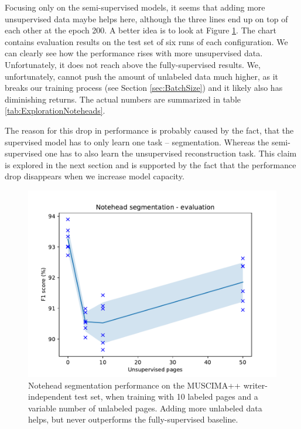 Focusing only on the semi-supervised models, it seems that adding more unsupervised data maybe helps here, although the three lines end up on top of each other at the epoch 200. A better idea is to look at Figure \ref{fig:ExplorationNoteheadsEvaluation}. The chart contains evaluation results on the test set of six runs of each configuration. We can clearly see how the performance rises with more unsupervised data. Unfortunately, it does not reach above the fully-supervised results. We, unfortunately, cannot push the amount of unlabeled data much higher, as it breaks our training process (see Section \ref{sec:BatchSize}) and it likely also has diminishing returns. The actual numbers are summarized in table \ref{tab:ExplorationNoteheads}.

The reason for this drop in performance is probably caused by the fact, that the supervised model has to only learn one task -- segmentation. Whereas the semi-supervised one has to also learn the unsupervised reconstruction task. This claim is explored in the next section and is supported by the fact that the performance drop disappears when we increase model capacity.

\begin{figure}[ht]
    \centering
    \includegraphics[width=140mm]{../../figures/01-exploration-noteheads/noteheads-evaluation.pdf}
    \caption{Notehead segmentation performance on the MUSCIMA++ writer-independent test set, when training with 10 labeled pages and a variable number of unlabeled pages. Adding more unlabeled data helps, but never outperforms the fully-supervised baseline.}
    \label{fig:ExplorationNoteheadsEvaluation}
\end{figure}

